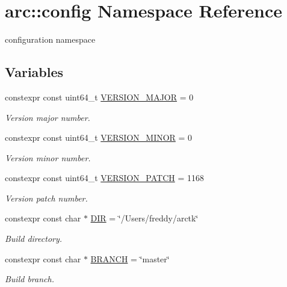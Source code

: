 \hypertarget{namespacearc_1_1config}{}\section{arc\+:\+:config Namespace Reference}
\label{namespacearc_1_1config}


configuration namespace  


\subsection*{Variables}
\begin{DoxyCompactItemize}
\item 
constexpr const uint64\+\_\+t \mbox{\hyperlink{namespacearc_1_1config_a2d17637229eb1a5c1cd130d0945a5308}{V\+E\+R\+S\+I\+O\+N\+\_\+\+M\+A\+J\+OR}} = 0
\begin{DoxyCompactList}\small\item\em Version major number. \end{DoxyCompactList}\item 
constexpr const uint64\+\_\+t \mbox{\hyperlink{namespacearc_1_1config_ad647132a40a28b2241f0406b168c1874}{V\+E\+R\+S\+I\+O\+N\+\_\+\+M\+I\+N\+OR}} = 0
\begin{DoxyCompactList}\small\item\em Version minor number. \end{DoxyCompactList}\item 
constexpr const uint64\+\_\+t \mbox{\hyperlink{namespacearc_1_1config_afc8283f15f7b5502fe48b6616a5d1207}{V\+E\+R\+S\+I\+O\+N\+\_\+\+P\+A\+T\+CH}} = 1168
\begin{DoxyCompactList}\small\item\em Version patch number. \end{DoxyCompactList}\item 
constexpr const char $\ast$ \mbox{\hyperlink{namespacearc_1_1config_a07a575e6c44170c6f629402c89f0a044}{D\+IR}} = \char`\"{}/Users/freddy/arctk\char`\"{}
\begin{DoxyCompactList}\small\item\em Build directory. \end{DoxyCompactList}\item 
constexpr const char $\ast$ \mbox{\hyperlink{namespacearc_1_1config_ad3826980a7fae51393802afb8fdcc382}{B\+R\+A\+N\+CH}} = \char`\"{}master\char`\"{}
\begin{DoxyCompactList}\small\item\em Build branch. \end{DoxyCompactList}\item 

\end{DoxyCompactItemize}
